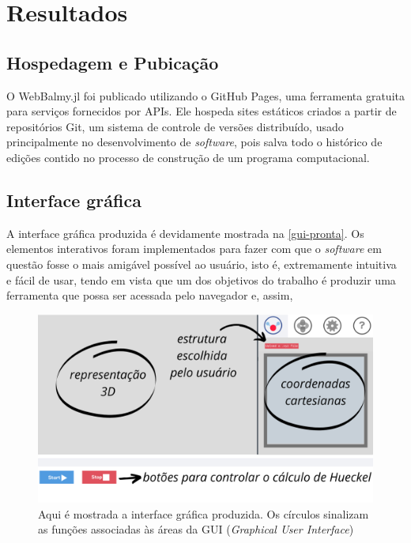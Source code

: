 \chapter{Resultados}
\section{Hospedagem e Pubicação}

O WebBalmy.jl foi publicado utilizando o GitHub Pages, uma ferramenta gratuita para serviços fornecidos por APIs. Ele hospeda sites estáticos criados a partir de repositórios Git, um sistema de controle de versões distribuído, usado principalmente no desenvolvimento de \textit{software}, pois salva todo o histórico de edições contido no processo de construção de um programa computacional. 

\section{Interface gráfica}

A interface gráfica produzida é devidamente mostrada na \autoref{gui-pronta}. Os elementos interativos foram implementados para fazer com que o \textit{software} em questão fosse o mais amigável possível ao usuário, isto é, extremamente intuitiva e fácil de usar, tendo em vista que um dos objetivos do trabalho é produzir uma ferramenta que possa ser acessada pelo navegador e, assim, 

\begin{figure}[htb]
	\caption{\label{gui-pronta} Aqui é mostrada a interface gráfica produzida. Os círculos sinalizam as funções associadas às áreas da GUI (\textit{Graphical User Interface})}
	\begin{center}
		\includegraphics[width=1.0\textwidth]{images/GUI-EXAMPLE.png}
	\end{center}
\end{figure}

